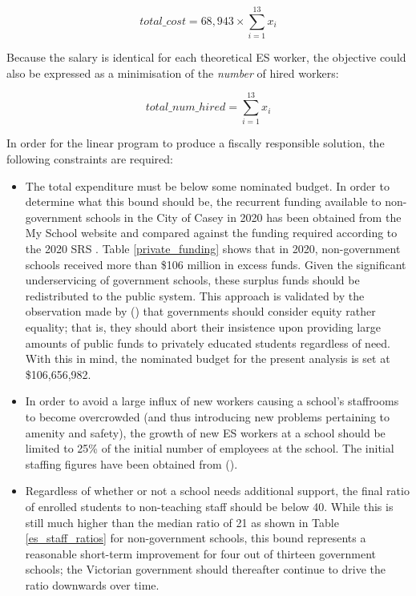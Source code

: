 \documentclass[11pt, a4paper]{article}
\begin{document}
    \begin{equation}
        total\_cost = 68,943 \times \sum_{i=1}^{13} x_i
    \end{equation}

    Because the salary is identical for each theoretical ES worker, the objective could also be expressed as a minimisation of the \textit{number} of hired workers:

    \begin{equation}
        total\_num\_hired = \sum_{i=1}^{13} x_i
    \end{equation}

    In order for the linear program to produce a fiscally responsible solution, the following constraints are required:

    \begin{itemize}
        \item The total expenditure must be below some nominated budget. In order to determine what this bound should be, the recurrent funding available to non-government schools in the City of Casey in 2020 has been obtained from the My School website \parencite{naplan} and compared against the funding required according to the 2020 SRS \parencite{srs_2020}. Table \ref{private_funding} shows that in 2020, non-government schools received more than \$106 million in excess funds. Given the significant underservicing of government schools, these surplus funds should be redistributed to the public system. This approach is validated by the observation made by  () that governments should consider equity rather equality; that is, they should abort their insistence upon providing large amounts of public funds to privately educated students regardless of need. With this in mind, the nominated budget for the present analysis is set at \$106,656,982.
        \item In order to avoid a large influx of new workers causing a school's staffrooms to become overcrowded (and thus introducing new problems pertaining to amenity and safety), the growth of new ES workers at a school should be limited to 25\% of the initial number of employees at the school. The initial staffing figures have been obtained from  ().
        \item Regardless of whether or not a school needs additional support, the final ratio of enrolled students to non-teaching staff should be below 40. While this is still much higher than the median ratio of 21 as shown in Table \ref{es_staff_ratios} for non-government schools, this bound represents a reasonable short-term improvement for four out of thirteen government schools; the Victorian government should thereafter continue to drive the ratio downwards over time.

\end{itemize}
\end{document}
